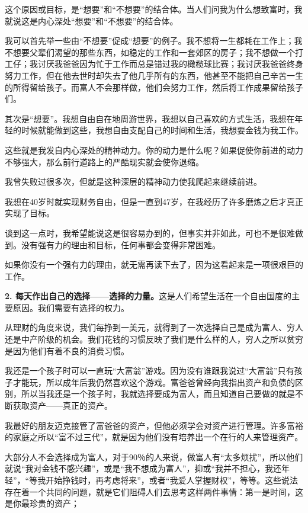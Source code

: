这个原因或目标，是“想要”和“不想要”的结合体。当人们问我为什么想致富时，我就说这是内心深处“想要”和“不想要”的结合体。

我可以首先举一些由“不想要”促成“想要”的例子。我不想将一生都耗在工作上；我不想要父辈们渴望的那些东西，如稳定的工作和一套郊区的房子；我不想做一个打工仔；我讨厌我爸爸因为忙于工作而总是错过我的橄榄球比赛；我讨厌我爸爸终身努力工作，但在他去世时却失去了他几乎所有的东西，他甚至不能把自己辛苦一生的所得留给孩子。而富人不会那样做，他们会努力工作，然后将工作成果留给孩子们。

其次是“想要”。我想自由自在地周游世界，我想以自己喜欢的方式生活，我想在年轻的时候就能做到这些，我想自由支配自己的时间和生活，我想要金钱为我工作。

这些就是我发自内心深处的精神动力。你的动力是什么呢？如果促使你前进的动力不够强大，那么前行道路上的严酷现实就会使你退缩。

我曾失败过很多次，但就是这种深层的精神动力使我爬起来继续前进。

我想在40岁时就实现财务自由，但是一直到47岁，在我经历了许多磨炼之后才真正实现了目标。

谈到这一点时，我希望能说这是很容易办到的，但事实并非如此，可也不是很难做到。没有强有力的理由和目标，任何事都会变得非常困难。

如果你没有一个强有力的理由，就无需再读下去了，因为这看起来是一项很艰巨的工作。

\textbf{2. 每天作出自己的选择——选择的力量。}这是人们希望生活在一个自由国度的主要原因。我们需要有选择的权力。

从理财的角度来说，我们每挣到一美元，就得到了一次选择自己是成为富人、穷人还是中产阶级的机会。我们花钱的习惯反映了我们是什么样的人，穷人之所以贫穷是因为他们有着不良的消费习惯。

我还是一个孩子时可以一直玩“大富翁”游戏。因为没有谁跟我说过“大富翁”只有孩子才能玩，所以成年后我仍然喜欢这个游戏。富爸爸曾经向我指出资产和负债的区别，所以当我还是一个孩子时，我就选择要成为富人，而且知道自己要做的就是不断获取资产——真正的资产。

我最好的朋友迈克接管了富爸爸的资产，但他必须学会对资产进行管理。许多富裕的家庭之所以“富不过三代”，就是因为他们没有培养出一个在行的人来管理资产。

大部分人不会选择成为富人，对于90％的人来说，做富人有“太多烦扰”，所以他们就说“我对金钱不感兴趣”，或是“我不想成为富人”，抑或“我并不担心，我还年轻”，“等我开始挣钱时，再考虑将来”，或者“我爱人掌握财权”，等等。这些说法存在着一个共同的问题，就是它们阻碍人们去思考这样两件事情：第一是时间，这是你最珍贵的资产；

